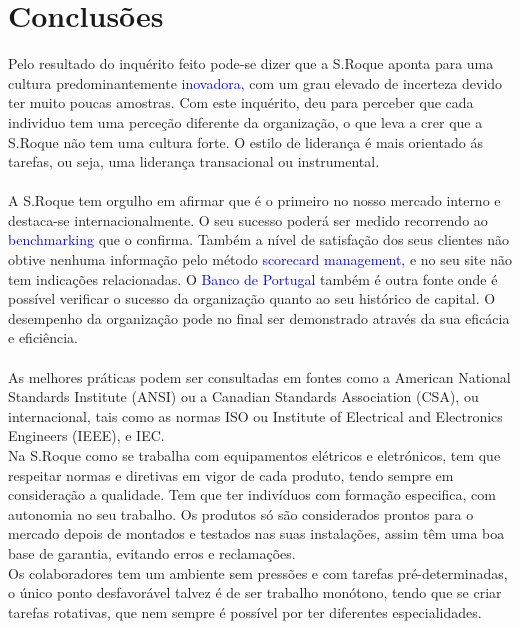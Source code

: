 \section{Conclusões}
\qquad Pelo resultado do inquérito feito pode-se dizer que a S.Roque aponta para uma cultura predominantemente \textcolor{blue}{inovadora}, com um grau elevado de incerteza devido ter muito poucas amostras. Com este inquérito, deu para perceber que cada individuo tem uma perceção diferente da organização, o que leva a crer que a S.Roque não tem uma cultura forte. O estilo de liderança é mais orientado ás tarefas, ou seja, uma liderança transacional ou instrumental.\\
\\
A S.Roque tem orgulho em afirmar que é o primeiro no nosso mercado interno e destaca-se internacionalmente. O seu sucesso poderá ser medido recorrendo ao \textcolor{blue}{benchmarking} que o confirma. Também a nível de satisfação dos seus clientes não obtive nenhuma informação pelo método \textcolor{blue}{scorecard management}, e no seu site não tem indicações relacionadas. O \textcolor{blue}{Banco de Portugal} também é outra fonte onde é possível verificar o sucesso da organização quanto ao seu histórico de capital. O desempenho da organização pode no final ser demonstrado através da sua eficácia e eficiência.\\
\\
As melhores práticas podem ser consultadas em fontes como a American National Standards Institute (ANSI) ou a Canadian Standards Association (CSA), ou internacional, tais como as normas ISO ou Institute of Electrical and Electronics Engineers (IEEE), e IEC. \\
Na S.Roque como se trabalha com equipamentos elétricos e eletrónicos, tem que respeitar normas e diretivas em vigor de cada produto, tendo sempre em consideração a qualidade. Tem que ter indivíduos com formação especifica, com autonomia no seu trabalho. Os produtos só são considerados prontos para o mercado depois de montados e testados nas suas instalações, assim têm uma boa base de garantia, evitando erros e reclamações.\\
Os colaboradores tem um ambiente sem pressões e com tarefas pré-determinadas, o único ponto desfavorável talvez é de ser trabalho monótono, tendo que se criar tarefas rotativas, que nem sempre é possível por ter diferentes especialidades.\\
\\

